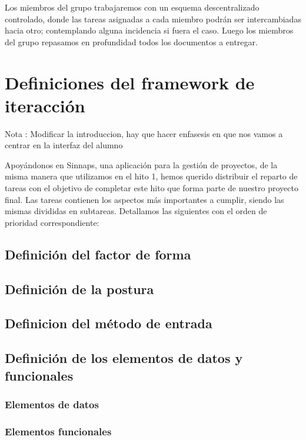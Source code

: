 \documentclass[12pt]{article}
\begin{document}
\begin{itemize}
Los miembros del grupo trabajaremos con un esquema descentralizado controlado, donde las tareas asignadas a cada miembro podrán ser intercambiadas hacia otro; contemplando alguna incidencia si fuera el caso. Luego los miembros del grupo repasamos en profundidad todos los documentos a entregar.

\end{itemize}
\newpage


\section{Definiciones del  framework  de iteracción}
Nota : Modificar la introduccion, hay que hacer enfasesis en que nos vamos a centrar en la interfaz del alumno

Apoyándonos en Sinnaps, una aplicación para la gestión de proyectos, de la misma manera que utilizamos en el hito 1, hemos querido distribuir el reparto de tareas con el objetivo de completar este hito que forma parte de nuestro proyecto final. Las tareas contienen los aspectos más importantes a cumplir, siendo las mismas divididas en subtareas. Detallamos las siguientes con el orden de prioridad correspondiente:

\subsection{Definición del factor de forma}
\subsection{Definición de la postura}
\subsection{Definicion del método de entrada}
\subsection{Definición de los elementos de datos y funcionales }
    \subsubsection{Elementos de datos}
    \subsubsection{Elementos funcionales}
\end{document}
